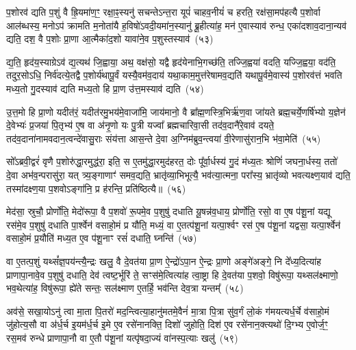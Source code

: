 प॒शोरव॑ द्यति प॒शुं वै ह्रि॒यमा॑ण॒ꣳ॒ रक्षा॒ꣴ॒स्यनु॑ सचन्ते\-ऽन्त॒रा यूपं॑ चाहव॒नीयं॑ च हरति॒ रक्ष॑सा॒मप॑हत्यै प॒शोर्वा आल॑ब्धस्य॒ मनो\-ऽप॑ क्रामति म॒नोता॑यै ह॒विषो॑\-ऽवदी॒यमा॑न॒स्यानु॑ ब्रू॒हीत्या॑ह॒ मन॑ ए॒वास्याव॑ रुन्ध॒ एका॑\-दशाव॒दाना॒न्यव॑ द्यति॒ दश॒ वै प॒शोः प्रा॒णा आ॒त्मैका॑द॒शो यावा॑ने॒व प॒शुस्तस्याव॑~(५३)\ip

द्य॒ति॒ हृद॑य॒स्याग्रे\-ऽव॑ द्य॒त्यथ॑ जि॒ह्वाया॒ अथ॒ वक्ष॑सो॒ यद्वै हृद॑येनाभि॒गच्छ॑ति॒ तज्जि॒ह्वया॑ वदति॒ यज्जि॒ह्वया॒ वद॑ति॒ तदुर॒सो\-ऽधि॒ निर्व॑दत्ये॒तद्वै प॒शोर्य॑थापू॒र्वं यस्यै॒वम॑व॒दाय॑ यथा॒काम॒मुत्त॑रेषामव॒द्यति॑ यथापू॒र्वमे॒वास्य॑ प॒शोरव॑त्तं भवति मध्य॒तो गु॒दस्याव॑ द्यति मध्य॒तो हि प्रा॒ण उ॑त्त॒मस्याव॑ द्यति~(५४)\ip

उ॒त्त॒मो हि प्रा॒णो यदीत॑रं॒ यदीत॑रमु॒भय॑मे॒वाजा॑मि॒ जाय॑मानो॒ वै ब्रा᳚ह्म॒णस्त्रि॒भिर्\mbox{}ऋ॑ण॒वा जा॑यते ब्रह्म॒चर्ये॒णर्\mbox{}षि॑भ्यो य॒ज्ञेन॑ दे॒वेभ्यः॑ प्र॒जया॑ पि॒तृभ्य॑ ए॒ष वा अ॑नृ॒णो यः पु॒त्री यज्वा᳚ ब्रह्मचारिवा॒सी तद॑व॒दानै॑रे॒वाव॑ दयते॒ तद॑व॒दाना॑नामवदान॒त्वन्दे॑वासु॒राः संय॑त्ता आस॒न्ते दे॒वा अ॒ग्निम॑ब्रुव॒न्त्वया॑ वी॒रेणासु॑रान॒भि भ॑वा॒मेति॑~(५५)\ip

सो᳚\-ऽब्रवी॒द्वरं॑ वृणै प॒शोरु॑द्धा॒रमुद्ध॑रा॒ इति॒ स ए॒तमु॑द्धा॒रमुद॑हरत॒ दोः पू᳚र्वा॒र्धस्य॑ गु॒दं म॑ध्य॒तः श्रोणिं॑ जघना॒र्धस्य॒ ततो॑ दे॒वा अभ॑व॒न्परासु॑रा॒ यत् त्र्य॒ङ्गाणाꣳ॑ समव॒द्यति॒ भ्रातृ॑व्या॒भिभूत्यै॒ भव॑त्या॒त्मना॒ परा᳚स्य॒ भ्रातृ॑व्यो भवत्यक्ष्ण॒याव॑ द्यति॒ तस्मा॑दक्ष्ण॒या प॒शवो\-ऽङ्गा॑नि॒ प्र ह॑रन्ति॒ प्रति॑ष्ठित्यै॥~(५६)\ip

{\anuvakamend[{ए॒तौ प॑शू॒नाꣳ समे॑धस्यै॒व तस्यावो᳚त्त॒मस्याव॑ द्य॒तीति॒ पञ्च॑चत्वारिꣳशच्च}]}%

मेद॑सा॒ स्रुचौ॒ प्रोर्णो॑ति॒ मेदो॑रूपा॒ वै प॒शवो॑ रू॒पमे॒व प॒शुषु॑ दधाति यू॒षन्न॑व॒धाय॒ प्रोर्णो॑ति॒ रसो॒ वा ए॒ष प॑शू॒नां यद्यू रस॑मे॒व प॒शुषु॑ दधाति पा॒र्श्वेन॑ वसाहो॒मं प्र यौ॑ति॒ मध्यं॒ वा ए॒तत्प॑शू॒नां यत्पा॒र्श्वꣳ रस॑ ए॒ष प॑शू॒नां यद्वसा॒ यत्पा॒र्श्वेन॑ वसाहो॒मं प्र॒यौति॑ मध्य॒त ए॒व प॑शू॒नाꣳ रसं॑ दधाति॒ घ्नन्ति॑~(५७)\ip

वा ए॒तत्प॒शुं यथ्सं᳚ज्ञ॒पय॑न्त्यै॒न्द्रः खलु॒ वै दे॒वत॑या प्रा॒ण ऐ॒न्द्रो॑\-ऽपा॒न ऐ॒न्द्रः प्रा॒णो अङ्गे॑अङ्गे॒ नि दे᳚ध्य॒दित्या॑ह प्राणापा॒नावे॒व प॒शुषु॑ दधाति॒ देव॑ त्वष्ट॒र्भूरि॑ ते॒ सꣳस॑मे॒त्वित्या॑ह त्वा॒ष्ट्रा हि दे॒वत॑या प॒शवो॒ विषु॑रूपा॒ यथ्सल॑क्ष्माणो॒ भव॒थेत्या॑ह॒ विषु॑रूपा॒ ह्ये॑ते सन्तः॒ सल॑क्ष्माण ए॒तर्\mbox{}हि॒ भव॑न्ति देव॒त्रा यन्तम्᳚~(५८)\ip

अव॑से॒ सखा॒यो\-ऽनु॑ त्वा मा॒ता पि॒तरो॑ मद॒न्त्वित्या॒हानु॑मतमे॒वैनं॑ मा॒त्रा पि॒त्रा सु॑व॒र्गं लो॒कं ग॑मयत्यर्ध॒र्चे व॑साहो॒मं जु॑होत्य॒सौ वा अ॑र्ध॒र्च इ॒यम॑र्ध॒र्च इ॒मे ए॒व रसे॑नानक्ति॒ दिशो॑ जुहोति॒ दिश॑ ए॒व रसे॑नान॒क्त्यथो॑ दि॒ग्भ्य ए॒वोर्ज॒ꣳ॒ रस॒मव॑ रुन्धे प्राणापा॒नौ वा ए॒तौ प॑शू॒नां यत्पृ॑षदा॒ज्यं वा॑नस्प॒त्याः खलु॑~(५९)\ip

